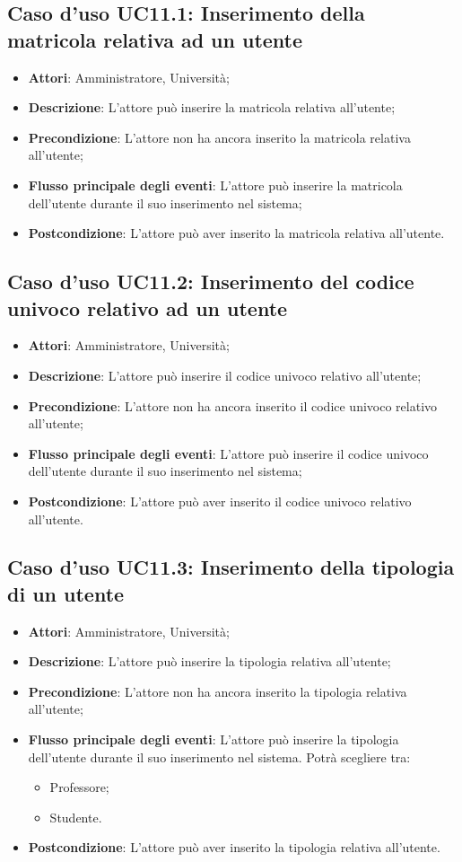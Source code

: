 \subsection{Caso d'uso \texorpdfstring{UC11.1}{UC11.1}: Inserimento della matricola relativa ad un utente}
\begin{itemize}
\item \textbf{Attori}: Amministratore, Università;
\item \textbf{Descrizione}: L'attore può inserire la matricola relativa all'utente;
\item \textbf{Precondizione}: L'attore non ha ancora inserito la matricola relativa all'utente;
\item \textbf{Flusso principale degli eventi}: L'attore può inserire la matricola dell'utente durante il suo inserimento nel sistema;
\item \textbf{Postcondizione}: L'attore può aver inserito la matricola relativa all'utente.
\end{itemize}
\subsection{Caso d'uso \texorpdfstring{UC11.2}{UC11.2}: Inserimento del codice univoco relativo ad un utente}
\begin{itemize}
\item \textbf{Attori}: Amministratore, Università;
\item \textbf{Descrizione}: L'attore può inserire il codice univoco relativo all'utente;
\item \textbf{Precondizione}: L'attore non ha ancora inserito il codice univoco relativo all'utente;
\item \textbf{Flusso principale degli eventi}: L'attore può inserire il codice univoco dell'utente durante il suo inserimento nel sistema;
\item \textbf{Postcondizione}: L'attore può aver inserito il codice univoco relativo all'utente.
\end{itemize}
\subsection{Caso d'uso \texorpdfstring{UC11.3}{UC11.3}: Inserimento della tipologia di un utente }
\begin{itemize}
\item \textbf{Attori}: Amministratore, Università;
\item \textbf{Descrizione}: L'attore può inserire la tipologia relativa all'utente;
\item \textbf{Precondizione}: L'attore non ha ancora inserito la tipologia relativa all'utente;
\item \textbf{Flusso principale degli eventi}: L'attore può inserire la tipologia dell'utente durante il suo inserimento nel sistema. Potrà scegliere tra:
\begin{itemize}
\item Professore;
\item Studente.
\end{itemize}
\item \textbf{Postcondizione}: L'attore può aver inserito la tipologia relativa all'utente.
\end{itemize}
